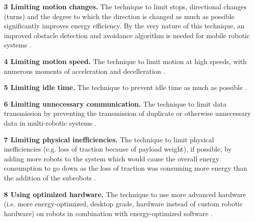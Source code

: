 \vspace{1mm}

\textbf{3 Limiting motion changes.} The technique to limit stops, directional changes (turns) and the degree to which the direction is changed as much as possible 
significantly improves energy efficiency. By the very nature of this technique, an improved obstacle detection and avoidance algorithm
is needed for mobile robotic systems
\cite{xie2018mecanum_wheel, kim2016firefighting_robot, benkrid2016multi_robot_exploration, barili1995efficient_motion, 
jia2004grid_strategy_exploration, mei2005energy_consumers_identified, patel2012exploration_strategy}.
    
\vspace{1mm}

\textbf{4 Limiting motion speed.} The technique to limit motion at high speeds, with numerous moments of acceleration and decelleration
\cite{wingstrom2013robot_cell_scheduling}.
    
\vspace{1mm}

\textbf{5 Limiting idle time.} The technique to prevent idle time as much as possible \cite{gurel2019industrial_robot_scheduling, 
kaitwanidvilai2020industrial_robot_cycle_time, wingstrom2013robot_cell_scheduling}.
    
\vspace{1mm}

\textbf{6 Limiting unnecessary communication.} The technique to limit data transmission by preventing the transmission of duplicate 
or otherwise unnecessary data in multi-robotic systems \cite{huh2013distributed_swarm}.

\vspace{1mm}

\textbf{7 Limiting physical inefficiencies.} The technique to limit physical inefficiencies (e.g. loss of traction because of payload weight), if possible, by adding more robots to the system which would cause the overall
energy consumption to go down as the loss of traction was consuming more energy than the addition of the subrobots \cite{kim2016firefighting_robot}.
    
\vspace{1mm}

\textbf{8 Using optimized hardware.} The technique to use more advanced hardware (i.e. more energy-optimized, desktop grade, hardware instead of custom robotic hardware) 
on robots in combination with energy-optimized software \cite{cheng2018FPGA_image_recognition}.
    
